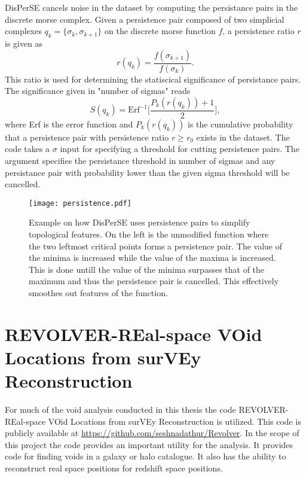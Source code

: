 DisPerSE cancels noise in the dataset by computing the persistance pairs
in the discrete morse complex. Given a persistence pair composed of two
simplicial complexes $q_k=\{\sigma_k,\sigma_{k+1}\}$ on the discrete morse
function $f$, a persistence ratio $r$ is given as
\begin{equation}
    r(q_k)=\frac{f(\sigma_{k+1})}{f(\sigma_k)}.
\end{equation}
This ratio is used for determining the statiscical significance of persistance
pairs. The significance given in "number of sigmas" reads 
\begin{equation}
    S(q_k)=\mathrm{Erf}^{-1}\Big[\frac{P_k(r(q_k))+1}{2}\Big],
\end{equation}
where Erf is the error function and $P_k(r(q_k))$ is the cumulative probability
that a persistence pair with persistence ratio $r\geq r_0$ exists in the
dataset. The code takes a $\sigma$ input for specifying a threshold for cutting
persistence pairs. The argument specifies the persistance threshold in number of
sigmas and any persistance pair with probability lower than the given sigma
threshold will be cancelled.


\begin{figure}\label{fig:persistence}
   \texttt{[image: persistence.pdf]}
   \caption{Example on how DisPerSE uses persistence pairs to simplify topological features. On the left is the unmodified function where the two leftmost critical points forms a persistence pair. The value of the minima is increased while the value of the maxima is increased. This is done untill the value of the minima surpasses that of the maximum and thus the persistence pair is cancelled. This effectively smoothes out features of the function.}
\end{figure}

\section{REVOLVER-REal-space VOid Locations from surVEy Reconstruction}
For much of the void analysis conducted in this thesis the code
REVOLVER-REal-space VOid Locations from surVEy Reconstruction is utilized. This
code is publicly available at \url{https://github.com/seshnadathur/Revolver}.
In the scope of this project the code provides an important utility for the
analysis. It provides code for finding voids in a galaxy or halo catalogue. It also has the ability
to reconstruct real space positions for redshift space positions.
